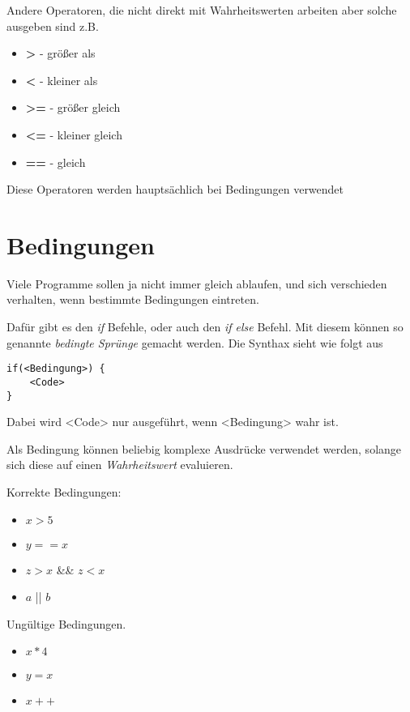 \documentclass[c_worksheet.tex]{subfiles}
\begin{document}
Andere Operatoren, die nicht direkt mit Wahrheitswerten arbeiten aber solche ausgeben sind z.B.

\begin{itemize}
	\item \textbf{>} - größer als
	\item \textbf{<} - kleiner als
	\item \textbf{>=} - größer gleich
	\item \textbf{<=} - kleiner gleich
	\item \textbf{==} - gleich
\end{itemize}

Diese Operatoren werden hauptsächlich bei Bedingungen verwendet

\section{Bedingungen}

Viele Programme sollen ja nicht immer gleich ablaufen, und sich verschieden verhalten, wenn bestimmte Bedingungen eintreten.

Dafür gibt es den \emph{if} Befehle, oder auch den \emph{if else} Befehl. Mit diesem können so genannte \emph{bedingte Sprünge} gemacht werden. Die Synthax sieht wie folgt aus

\begin{lstlisting}[numbers=none]
if(<Bedingung>) {
	<Code>
}
\end{lstlisting}

Dabei wird <Code> nur ausgeführt, wenn <Bedingung> wahr ist.

Als Bedingung können beliebig komplexe Ausdrücke verwendet werden, solange sich diese auf einen \emph{Wahrheitswert} evaluieren.

Korrekte Bedingungen:

\begin{itemize}
	\item \(x > 5\)
	\item \(y == x\)
	\item \(z > x\) \&\& \(z < x\)
	\item \(a\) || \(b\)
\end{itemize}

Ungültige Bedingungen.

\begin{itemize}
	\item \(x * 4\)
	\item \(y = x\)
	\item \(x++\)
\end{itemize}
\end{document}
